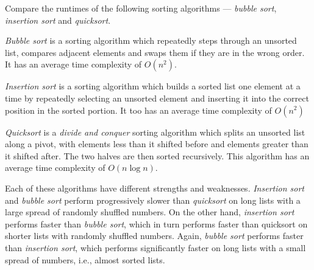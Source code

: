

\problem Compare the runtimes of the following sorting algorithms --- \textit{bubble sort}, \textit{insertion sort} and \textit{quicksort}.

\solution \textit{Bubble sort} is a sorting algorithm which repeatedly steps through an unsorted list, compares adjacent elements and
swaps them if they are in the wrong order. It has an average time complexity of $O(n^2)$.

\textit{Insertion sort} is a sorting algorithm which builds a sorted list one element at a time by repeatedly selecting an unsorted
element and inserting it into the correct position in the sorted portion. It too has an average time complexity of $O(n^2)$

\textit{Quicksort} is a \textit{divide and conquer} sorting algorithm which splits an unsorted list along a pivot, with elements
less than it shifted before and elements greater than it shifted after. The two halves are then sorted recursively. This algorithm has
an average time complexity of $O(n \log{n})$.

Each of these algorithms have different strengths and weaknesses. \textit{Insertion sort} and \textit{bubble sort} perform progressively slower than
\textit{quicksort} on long lists with a large spread of randomly shuffled numbers. On the other hand, \textit{insertion sort} performs faster than
\textit{bubble sort}, which in turn performs faster than quicksort on shorter lists with randomly shuffled numbers. Again, \textit{bubble sort} 
performs faster than \textit{insertion sort}, which performs significantly faster on long lists with a small spread of numbers, i.e., almost sorted
lists.\\

